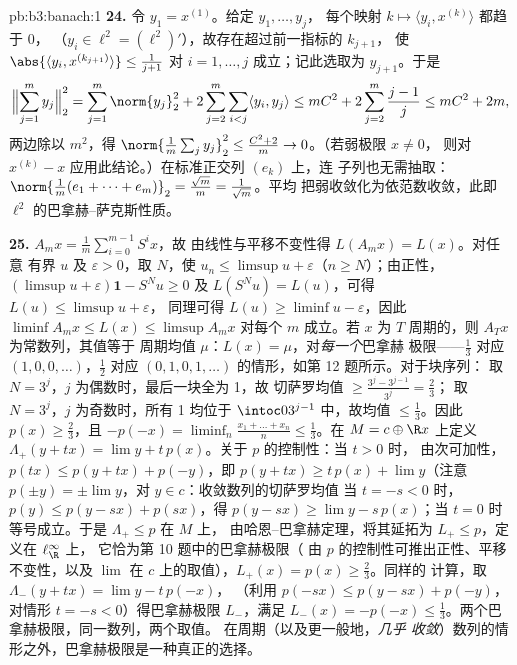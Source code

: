 \begin{solution}{pb:b3:banach:1}
\textbf{24.} 令 $y_1 = x^{(1)}$。给定 $y_1, \dots, y_j$，
每个映射 $k \mapsto \langle y_i, x^{(k)}\rangle$ 都趋于 $0$，
（$y_i \in \ell^2 = (\ell^2)'$），故存在超过前一指标的 $k_{j+1}$，
使 $\abs{\langle y_i,
x^{(k_{j+1})}\rangle} \leq \frac1{j+1}$ 对 $i = 1, \dots,
j$ 成立；记此选取为 $y_{j+1}$。于是
\[
\Bigl\lVert\sum_{j=1}^my_j\Bigr\rVert_2^2
= \sum_{j=1}^m\norm{y_j}_2^2
+ 2\sum_{j=2}^m\sum_{i<j}\langle y_i, y_j\rangle
\leq mC^2 + 2\sum_{j=2}^m\frac{j-1}j
\leq mC^2 + 2m,
\]
两边除以 $m^2$，得 $\norm{\frac1m\sum_jy_j}_2^2 \leq
\frac{C^2 + 2}m \to 0$。（若弱极限 $x \neq 0$，
则对 $x^{(k)} - x$ 应用此结论。）在标准正交列 $(e_k)$ 上，连
子列也无需抽取：$\norm{\frac1m(e_1 + \dots +
e_m)}_2 = \frac{\sqrt m}m = \frac1{\sqrt m}$。平均
把弱收敛化为依范数收敛，此即
$\ell^2$ 的巴拿赫--萨克斯性质。

\textbf{25.} $A_mx = \frac1m\sum_{i=0}^{m-1}S^ix$，故
由线性与平移不变性得 $L(A_mx) = L(x)$。对任意
有界 $u$ 及 $\varepsilon > 0$，取 $N$，使 $u_n \leq
\limsup u + \varepsilon$（$n \geq N$）；由正性，
$(\limsup u + \varepsilon)\mathbf 1 - S^Nu \geq 0$ 及
$L(S^Nu) = L(u)$，可得 $L(u) \leq \limsup u + \varepsilon$，
同理可得 $L(u) \geq \liminf u - \varepsilon$，因此
$\liminf A_mx \leq L(x) \leq \limsup A_mx$ 对每个 $m$ 成立。若
$x$ 为 $T$ 周期的，则 $A_Tx$ 为常数列，其值等于
周期均值 $\mu$：$L(x) = \mu$，对\emph{每一个}巴拿赫
极限——$\frac13$ 对应 $(1,0,0,\dots)$，$\frac12$ 对应
$(0,1,0,1,\dots)$ 的情形，如第 12 题所示。对于块序列：
取 $N = 3^j$，$j$ 为偶数时，最后一块全为 1，故
切萨罗均值 $\geq \frac{3^j - 3^{j-1}}{3^j} = \frac23$；
取 $N = 3^j$，$j$ 为奇数时，所有 1 均位于 $\intoc0
{3^{j-1}}$ 中，故均值 $\leq \frac13$。因此 $p(x) \geq
\frac23$，且 $-p(-x) = \liminf_n\frac{x_1 + \dots + x_n}n
\leq \frac13$。在 $M = c \oplus \R x$ 上定义 $\Lambda_+(y +
tx) = \lim y + t\,p(x)$。关于 $p$ 的控制性：当 $t > 0$ 时，
由次可加性，$p(tx) \leq p(y + tx) + p(-y)$，即
$p(y + tx) \geq t\,p(x) + \lim y$（注意 $p(\pm y) = \pm\lim
y$，对 $y \in c$：收敛数列的切萨罗均值
当 $t = -s < 0$ 时，$p(y) \leq p(y -
sx) + p(sx)$，得 $p(y - sx) \geq \lim y - s\,p(x)$；当 $t
= 0$ 时等号成立。于是 $\Lambda_+ \leq p$ 在 $M$ 上，
由哈恩--巴拿赫定理，将其延拓为 $L_+ \leq p$，定义在 $\ell^\infty_\R$ 上，
它恰为第 10 题中的巴拿赫极限（
由 $p$ 的控制性可推出正性、平移不变性，以及
$\lim$ 在 $c$ 上的取值），$L_+(x) = p(x) \geq \frac23$。同样的
计算，取 $\Lambda_-(y + tx) = \lim y - t\,p(-x)$，
（利用 $p(-sx) \leq p(y - sx) + p(-y)$，对情形 $t = -s
< 0$）得巴拿赫极限 $L_-$，满足 $L_-(x) = -p(-x) \leq
\frac13$。两个巴拿赫极限，同一数列，两个取值。
在周期（以及更一般地，\emph{几乎
收敛}）数列的情形之外，巴拿赫极限是一种真正的选择。
\end{solution}
